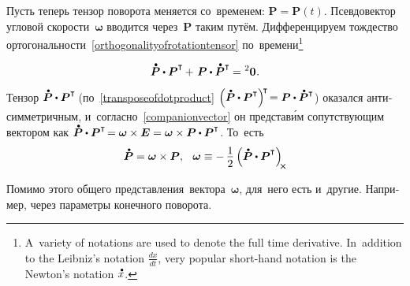 \begin{otherlanguage}{russian}
Пусть теперь тензор поворота меняется со~временем: ${\bm{P} \!=\! \bm{P}(t)}$.
Псевдовектор угловой скорости~${\bm{\omega}}$ вводится через~$\bm{P}$ таким путём.
Дифференцируем тождество ортогональности~\eqref{orthogonalityofrotationtensor} по~времени\footnote{A~variety of notations are used to denote the full time derivative. In~addition to the Leibniz’s notation ${\frac{dx}{dt}}$, very popular short-hand notation is the  Newton’s notation ${\mathdotabove{x}}$.}

\nopagebreak\vspace{-0.1em}\begin{equation*}
\mathdotabove{\bm{P}} \dotp \bm{P}^{\T} \hspace{-0.1ex} + \hspace{0.25ex} \bm{P} \dotp \mathdotabove{\bm{P}}^{\T} \hspace{-0.1ex} = \hspace{0.1ex} {^2\bm{0}}
\hspace{.1ex} .
\end{equation*}

Тензор ${\mathdotabove{\bm{P}} \dotp \bm{P}^{\T\!}}$ (по~\eqref{transposeofdotproduct} ${\left({ \mathdotabove{\bm{P}} \dotp \bm{P}^{\T} }\right)^{\raisemath{-0.25em}{\!\T}} \hspace{-0.36ex} = \bm{P} \dotp \mathdotabove{\bm{P}}^{\T}}$) оказался анти\-сим\-метрич\-ным, и~согласно~\eqref{companionvector} он представ\'{и}м сопутствующим вектором как ${\mathdotabove{\bm{P}} \dotp \bm{P}^{\T\!} = \bm{\omega} \times \bm{E} = \bm{\omega} \times \bm{P} \dotp \bm{P}^{\T}}$\!. То~есть
\vspace{0.1em}\begin{equation}\label{angularvelocityvector}
\mathdotabove{\bm{P}} = \bm{\omega} \times \bm{P}, \;\:\:
\bm{\omega} \equiv -\, \displaystyle \onehalf \left( \mathdotabove{\bm{P}} \dotp \bm{P}^{\T} \right)_{\hspace{-0.2em}\Xcompanion}
\vspace{-0.25em}\end{equation}

Помимо этого общего представления~вектора~${\bm{\omega}}$, для~него есть и~другие. Например, через параметры конечного поворота.


\end{otherlanguage}
